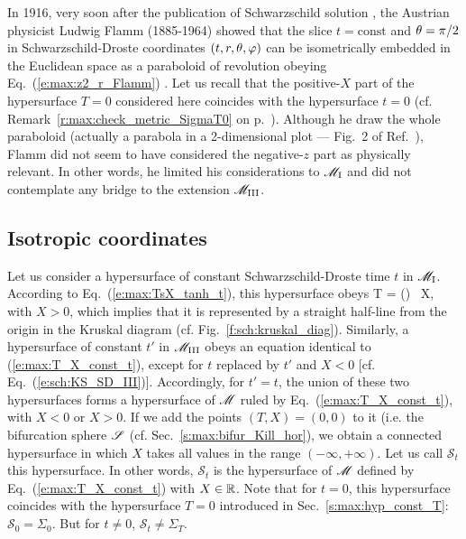 \begin{hist}
In 1916, very soon after the publication of Schwarzschild solution
\cite{Schwa1916}, the Austrian physicist Ludwig Flamm (1885-1964) showed that the slice $t=\mathrm{const}$
and $\theta=\pi/2$ in Schwarzschild-Droste coordinates $(t,r,\theta,\varphi)$
can be isometrically embedded in the Euclidean space as a paraboloid of
revolution obeying Eq.~(\ref{e:max:z2_r_Flamm}) \cite{Flamm1916}.
Let us recall that the positive-$X$ part of the hypersurface $T=0$ considered here coincides with the
hypersurface $t=0$ (cf. Remark~\ref{r:max:check_metric_SigmaT0} on p.~\pageref{r:max:check_metric_SigmaT0}). Although he draw the whole paraboloid (actually
a parabola in a 2-dimensional plot --- Fig.~2 of Ref.~\cite{Flamm1916}), Flamm did not seem to have considered
the negative-$z$ part as physically relevant. In other words,
he limited his considerations to $\mathscr{M}_{\rm I}$ and did not contemplate any bridge to
the extension $\mathscr{M}_{\rm III}$.
\end{hist}

\subsection{Isotropic coordinates} \label{s:max:isotropic_coord}

Let us consider a hypersurface of constant Schwarzschild-Droste time $t$
in $\mathscr{M}_{\rm I}$. According to Eq.~(\ref{e:max:TsX_tanh_t}), this hypersurface
obeys
\be \label{e:max:T_X_const_t}
    T = \tanh\left(\right) \, X,
\ee
with $X>0$,
which implies that it is represented by a straight half-line from the origin
in the Kruskal diagram (cf. Fig.~\ref{f:sch:kruskal_diag}).
Similarly, a hypersurface of constant $t'$
in $\mathscr{M}_{\rm III}$ obeys an equation identical to (\ref{e:max:T_X_const_t}),
except for $t$ replaced by $t'$ and $X<0$ [cf. Eq.~(\ref{e:sch:KS_SD_III})].
Accordingly, for $t'=t$, the union of these two hypersurfaces
forms a hypersurface of $\mathscr{M}$ ruled by Eq.~(\ref{e:max:T_X_const_t}),
with $X<0$ or $X>0$. If we add the points $(T,X)=(0,0)$ to it (i.e. the
bifurcation sphere $\mathscr{S}$ (cf. Sec.~\ref{s:max:bifur_Kill_hor}),
we obtain a connected hypersurface in which $X$ takes all values in
the range $(-\infty,+\infty)$. Let us call $\mathcal{S}_t$ this hypersurface.
In other words, $\mathcal{S}_t$ is the hypersurface of $\mathscr{M}$ defined by
Eq.~(\ref{e:max:T_X_const_t}) with $X\in\mathbb{R}$.
Note that for $t=0$, this hypersurface coincides with the hypersurface
$T=0$ introduced in Sec.~\ref{s:max:hyp_const_T}: $\mathcal{S}_0 = \Sigma_0$.
But for $t\not=0$, $\mathcal{S}_t \not= \Sigma_T$.

